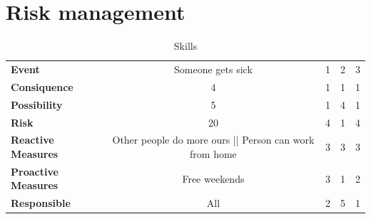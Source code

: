\documentclass{article}
\newcommand{\ra}[1]{\renewcommand{\arraystretch}{#1}}
\begin{document}
\section{Risk management}

\begin{table}\centering \ra{1.3}
    \caption{Skills}
    \label{tab:skills}
    \vspace{2mm}
    \begin{tabular}{lcccc}
    \toprule
									
    \midrule
    \textbf{Event                	 } & Someone gets sick  		       & 1     & 2     & 3     \\ 
    \textbf{Consiquence              } & 4       					       & 1     & 1     & 1     \\ 
    \textbf{Possibility				 } & 5         						   & 1     & 4     & 1     \\ 
    \textbf{Risk                     } & 20        						   & 4     & 1     & 4     \\ 
    \textbf{Reactive Measures        } & Other people do more ours || Person can work from home         & 3     & 3     & 3     \\ 
    \textbf{Proactive Measures       } & Free weekends        			   & 3     & 1     & 2     \\ 
    \textbf{Responsible              } & All        					   & 2     & 5     & 1     \\ 
   
    \bottomrule
    \end{tabular}
\end{table}
\end{document}
